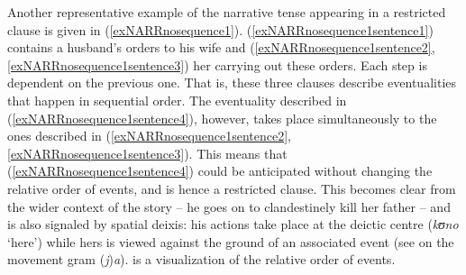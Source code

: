 Another representative example of the narrative tense appearing in a restricted clause is given in (\ref{exNARRnosequence1}). (\ref{exNARRnosequence1sentence1}) contains a husband's orders to his wife and (\ref{exNARRnosequence1sentence2}, \ref{exNARRnosequence1sentence3}) her carrying out these orders. Each step is dependent on the previous one. That is, these three clauses describe eventualities that happen in sequential order. The eventuality described in (\ref{exNARRnosequence1sentence4}), however, takes place simultaneously to the ones described in (\ref{exNARRnosequence1sentence2}, \ref{exNARRnosequence1sentence3}). This means that (\ref{exNARRnosequence1sentence4}) could be anticipated without changing the relative order of events, and is hence a restricted clause. This becomes clear from the wider context of the story -- he goes on to clandestinely kill her father -- and is also signaled by spatial deixis: his actions take place at the deictic centre (\textit{kʊno} \lq here') while hers is viewed against the ground of an associated  event (see  on the movement gram (\textit{j})\textit{a}).  is a visualization of the relative order of events.


